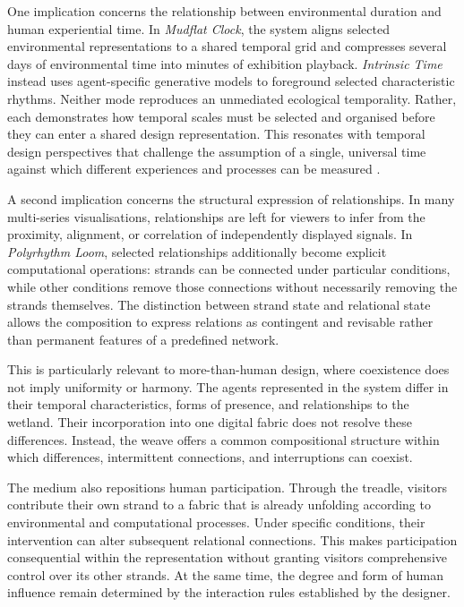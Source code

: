 \documentclass[manuscript,review,anonymous]{acmart}
\begin{document}
One implication concerns the relationship between environmental duration and human experiential time. In \emph{Mudflat Clock}, the system aligns selected environmental representations to a shared temporal grid and compresses several days of environmental time into minutes of exhibition playback. \emph{Intrinsic Time} instead uses agent-specific generative models to foreground selected characteristic rhythms. Neither mode reproduces an unmediated ecological temporality. Rather, each demonstrates how temporal scales must be selected and organised before they can enter a shared design representation. This resonates with temporal design perspectives that challenge the assumption of a single, universal time against which different experiences and processes can be measured \cite{pschetz2018,bastian2022}.

A second implication concerns the structural expression of relationships. In many multi-series visualisations, relationships are left for viewers to infer from the proximity, alignment, or correlation of independently displayed signals. In \emph{Polyrhythm Loom}, selected relationships additionally become explicit computational operations: strands can be connected under particular conditions, while other conditions remove those connections without necessarily removing the strands themselves. The distinction between strand state and relational state allows the composition to express relations as contingent and revisable rather than permanent features of a predefined network.

This is particularly relevant to more-than-human design, where coexistence does not imply uniformity or harmony. The agents represented in the system differ in their temporal characteristics, forms of presence, and relationships to the wetland. Their incorporation into one digital fabric does not resolve these differences. Instead, the weave offers a common compositional structure within which differences, intermittent connections, and interruptions can coexist.

The medium also repositions human participation. Through the treadle, visitors contribute their own strand to a fabric that is already unfolding according to environmental and computational processes. Under specific conditions, their intervention can alter subsequent relational connections. This makes participation consequential within the representation without granting visitors comprehensive control over its other strands. At the same time, the degree and form of human influence remain determined by the interaction rules established by the designer.
\end{document}

